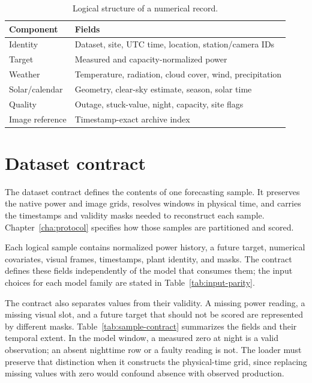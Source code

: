 \begin{table}[htbp]
\centering
\begin{tabularx}{\textwidth}{@{}lY@{}}
\hline
Component & Fields \\
\hline
Identity & Dataset, site, UTC time, location, station/camera IDs \\
Target & Measured and capacity-normalized power \\
Weather & Temperature, radiation, cloud cover, wind, precipitation \\
Solar/calendar & Geometry, clear-sky estimate, season, solar time \\
Quality & Outage, stuck-value, night, capacity, site flags \\
Image reference & Timestamp-exact archive index \\
\hline
\end{tabularx}
\caption{Logical structure of a numerical record.}
\label{tab:numerical-record}
\end{table}

\section{Dataset contract}
\label{sec:contract}

The dataset contract defines the contents of one forecasting sample. It preserves the native power and image grids, resolves windows in physical time, and carries the timestamps and validity masks needed to reconstruct each sample. Chapter~\ref{cha:protocol} specifies how those samples are partitioned and scored.

Each logical sample contains normalized power history, a future target, numerical covariates, visual frames, timestamps, plant identity, and masks. The contract defines these fields independently of the model that consumes them; the input choices for each model family are stated in Table~\ref{tab:input-parity}.

The contract also separates values from their validity. A missing power reading, a missing visual slot, and a future target that should not be scored are represented by different masks. Table~\ref{tab:sample-contract} summarizes the fields and their temporal extent. In the model window, a measured zero at night is a valid observation; an absent nighttime row or a faulty reading is not. The loader must preserve that distinction when it constructs the physical-time grid, since replacing missing values with zero would confound absence with observed production.

